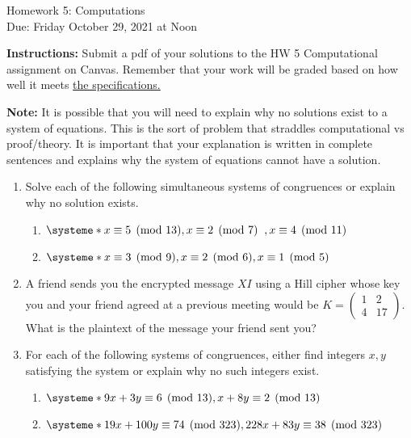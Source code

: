 \documentclass[10pt,a4paper]{article}
\newcommand{\ds}{\displaystyle}
\begin{document}
\begin{center}
{\Large Homework 5: Computations}\\
Due: Friday October 29, 2021 at Noon\\


\end{center}
{\bf Instructions:} Submit a pdf of your solutions to the HW 5 Computational assignment on Canvas. Remember that your work will be graded based on how well it meets \href{https://docs.google.com/document/d/1emM06_WRh_h941rsjtRE9fRVndJtfRKd9gyS3Fs_rFA/edit?usp=sharing}{the specifications. }


{\bf Note:} It is possible that you will need to explain why no solutions exist to a system of equations. This is the sort of problem that straddles computational vs proof/theory. It is important that your explanation is written in complete sentences and explains why the system of equations cannot have a solution. 

\begin{enumerate}

\item Solve each of the following simultaneous systems of congruences or explain
why no solution exists.
\begin{enumerate}
\item $\systeme*{x\equiv 5\pmod{13}, x\equiv 2\pmod{7}\;\;, x\equiv 4 \pmod{11}}$
\item $\systeme*{x\equiv 3\pmod{9}, x\equiv 2\pmod 6, x\equiv 1\pmod{5}}$
\end{enumerate}
   
 \item  A friend sends you the encrypted message $XI$ using a Hill cipher whose key you and your friend agreed at a previous meeting would be $K = \begin{pmatrix}
1 & 2\\ 
4 & 17
\end{pmatrix}$.  What is the plaintext of the message your friend sent you?

\item For each of the following systems of congruences, either find integers $x,y$ satisfying the system or explain why no such integers exist. 
\begin{enumerate}
\item  $\ds
\systeme*{9x+3y \equiv 6 \pmod {13}, x+8y \equiv 2 \pmod {13}}$
\item $\ds \systeme*{19x+100y \equiv 74 \pmod {323}, 228x+83y \equiv 38 \pmod {323}}$
\end{enumerate}
\end{enumerate}
\end{document}
